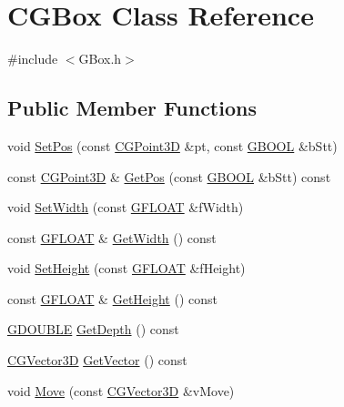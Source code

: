 \hypertarget{class_c_g_box}{}\section{C\+G\+Box Class Reference}
\label{class_c_g_box}


{\ttfamily \#include $<$G\+Box.\+h$>$}

\subsection*{Public Member Functions}
\begin{DoxyCompactItemize}
\item 
void \hyperlink{class_c_g_box_a17a6b9f1acd327fd253330a1dfed977c}{Set\+Pos} (const \hyperlink{class_c_g_point3_d}{C\+G\+Point3\+D} \&pt, const \hyperlink{_g_types_8h_a2901915743626352a6820c5405f556dc}{G\+B\+O\+O\+L} \&b\+Stt)
\item 
const \hyperlink{class_c_g_point3_d}{C\+G\+Point3\+D} \& \hyperlink{class_c_g_box_a81899fc627bcf1c5914a8138a68496f8}{Get\+Pos} (const \hyperlink{_g_types_8h_a2901915743626352a6820c5405f556dc}{G\+B\+O\+O\+L} \&b\+Stt) const 
\item 
void \hyperlink{class_c_g_box_aa4bece426b21a128cc29d5d16179fa23}{Set\+Width} (const \hyperlink{_g_types_8h_abf6eba8223df62f199b811a6c52ff2ef}{G\+F\+L\+O\+A\+T} \&f\+Width)
\item 
const \hyperlink{_g_types_8h_abf6eba8223df62f199b811a6c52ff2ef}{G\+F\+L\+O\+A\+T} \& \hyperlink{class_c_g_box_a13ec03b3e5eaec3349db26388a53be72}{Get\+Width} () const 
\item 
void \hyperlink{class_c_g_box_ad8d2cf0d2e6bd1b1a77c8ab46c0ab08d}{Set\+Height} (const \hyperlink{_g_types_8h_abf6eba8223df62f199b811a6c52ff2ef}{G\+F\+L\+O\+A\+T} \&f\+Height)
\item 
const \hyperlink{_g_types_8h_abf6eba8223df62f199b811a6c52ff2ef}{G\+F\+L\+O\+A\+T} \& \hyperlink{class_c_g_box_a23f3258405f5f726fd7b86366e728811}{Get\+Height} () const 
\item 
\hyperlink{_g_types_8h_afd05ac85f90ee8e2a733928545462cd4}{G\+D\+O\+U\+B\+L\+E} \hyperlink{class_c_g_box_aa89156cf00b5b8533922fd90a624adb6}{Get\+Depth} () const 
\item 
\hyperlink{_g_point3_d_8h_aa7e73d39f4c991acb5a13c84b498366d}{C\+G\+Vector3\+D} \hyperlink{class_c_g_box_ab29a188df2cfdcc35ced95fdee5606a6}{Get\+Vector} () const 
\item 
void \hyperlink{class_c_g_box_ae6aa614911c8a72565064886dfdd1d78}{Move} (const \hyperlink{_g_point3_d_8h_aa7e73d39f4c991acb5a13c84b498366d}{C\+G\+Vector3\+D} \&v\+Move)

\end{DoxyCompactItemize}
